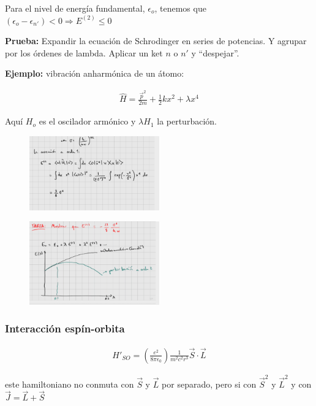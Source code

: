 Para el nivel de energía fundamental, $\epsilon_o$, tenemos que $(\epsilon_o-\epsilon_{n'})<0\Rightarrow E^{(2)}\leq 0$

\textbf{Prueba:} Expandir la ecuación de Schrodinger en series de potencias. Y agrupar por los órdenes de lambda. Aplicar un ket $n$ o $n'$ y ``despejar''.

\textbf{Ejemplo:} vibración anharmónica de un átomo:

\begin{align*}
    \hat{H}=\frac{\vec{p}^2}{2m}+\frac{1}{2}kx^2+\lambda x^4
\end{align*}

Aquí $H_o$ es el oscilador armónico y $\lambda H_1$ la perturbación.

\begin{figure}[H]
    \centering
    \includegraphics[width=0.5\textwidth]{Graficas/Aug23-1.png}
\end{figure}

\begin{figure}[H]
    \centering
    \includegraphics[width=0.5\textwidth]{Graficas/Aug23-2.png}
\end{figure}

\subsubsection{Interacción espín-orbita}

\begin{align}
    H'_{SO}=\left(\frac{e^2}{8\pi\epsilon_0}\right)\frac{1}{m^2c^2r^3}\vec{S}\cdot\vec{L}
\end{align}

este hamiltoniano no conmuta con $\vec{S}$ y $\vec{L}$ por separado, pero si con $\vec{S}^2$ y $\vec{L}^2$ y con $\vec{J}=\vec{L}+\vec{S}$

